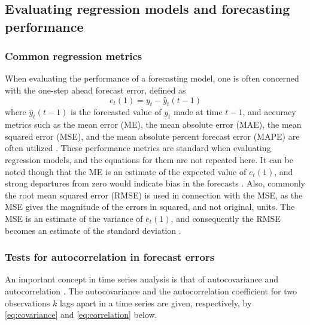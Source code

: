 

 
\subsection{Evaluating regression models and forecasting performance}
\label{sec:reg_metrics}
\subsubsection{Common regression metrics}
When evaluating the performance of a forecasting model, one is often concerned with the one-step ahead forecast error, defined as
$$e_t(1) = y_t - \hat{y}_t (t-1)$$ 
where $\hat{y}_t (t-1)$ is the forecasted value of $y_t$ made at time $t-1$, and accuracy metrics such as the mean error (ME), the mean absolute error (MAE), the mean squared error (MSE), and the mean absolute percent forecast error (MAPE) are often utilized \cite{Montgomery2015}. These performance metrics are standard when evaluating regression models, and the equations for them are not repeated here. It can be noted though that the ME is an estimate of the expected value of $e_t(1)$, and strong departures from zero would indicate bias in the forecasts \cite{Montgomery2015}. Also, commonly the root mean squared error (RMSE) is used in connection with the MSE, as the MSE gives the magnitude of the errors in squared, and not original, units. The MSE is an estimate of the variance of $e_t(1)$, and consequently the RMSE becomes an estimate of the standard deviation \cite{Montgomery2012}. 

\subsubsection{Tests for autocorrelation in forecast errors}
An important concept in time series analysis is that of autocovariance and autocorrelation \cite{Montgomery2015}. The autocovariance and  the autocorrelation coefficient for two observations $k$ lags apart in a time series are given, respectively, by \cref{eq:covariance} and \cref{eq:correlation} below.  

